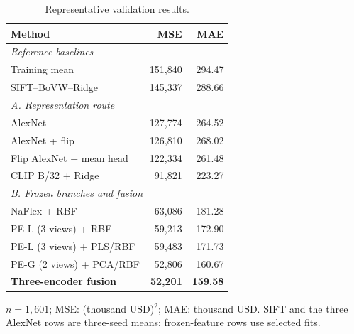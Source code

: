 \begin{table}[t]
\centering
\caption{Representative validation results.}
\label{tab:representative-results-zh}
\small
\setlength{\tabcolsep}{3pt}
\renewcommand{\arraystretch}{1.0}
\begin{tabular*}{\columnwidth}{@{\extracolsep{\fill}}lrr@{}}
\hline
Method & MSE & MAE \\
\hline
\multicolumn{3}{l}{\emph{Reference baselines}} \\
Training mean & 151,840 & 294.47 \\
SIFT--BoVW--Ridge & 145,337 & 288.66 \\
\multicolumn{3}{l}{\emph{A. Representation route}} \\
AlexNet & 127,774 & 264.52 \\
AlexNet + flip & 126,810 & 268.02 \\
Flip AlexNet + mean head & 122,334 & 261.48 \\
CLIP B/32 + Ridge & 91,821 & 223.27 \\
\multicolumn{3}{l}{\emph{B. Frozen branches and fusion}} \\
NaFlex + RBF & 63,086 & 181.28 \\
PE-L (3 views) + RBF & 59,213 & 172.90 \\
PE-L (3 views) + PLS/RBF & 59,483 & 171.73 \\
PE-G (2 views) + PCA/RBF & 52,806 & 160.67 \\
\textbf{Three-encoder fusion} & \textbf{52,201} & \textbf{159.58} \\
\hline
\end{tabular*}
\par\smallskip
\begin{minipage}{\columnwidth}\scriptsize
$n=1{,}601$; MSE: (thousand USD)$^2$; MAE: thousand USD. SIFT and the three AlexNet rows are three-seed means; frozen-feature rows use selected fits.
\end{minipage}
\end{table}
